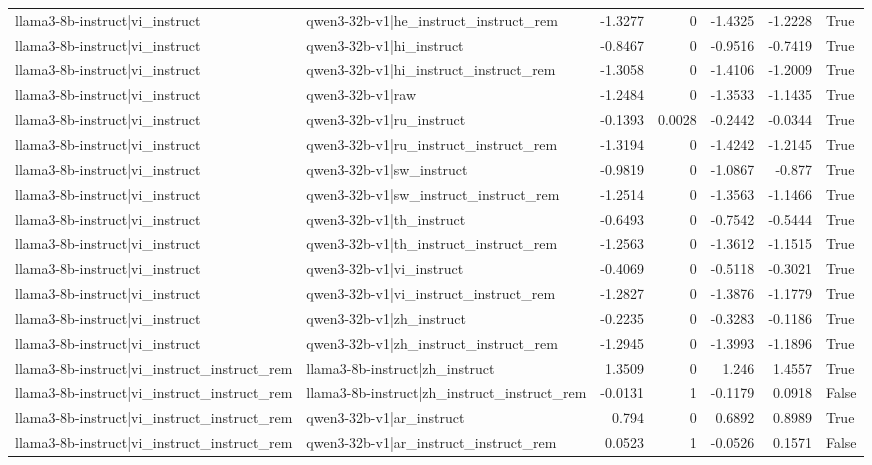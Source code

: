 \begin{table}
\begin{tabular}{l l r r r r l}
llama3-8b-instruct|vi_instruct & qwen3-32b-v1|he_instruct_instruct_rem & -1.3277 & 0 & -1.4325 & -1.2228 & True \\
llama3-8b-instruct|vi_instruct & qwen3-32b-v1|hi_instruct & -0.8467 & 0 & -0.9516 & -0.7419 & True \\
llama3-8b-instruct|vi_instruct & qwen3-32b-v1|hi_instruct_instruct_rem & -1.3058 & 0 & -1.4106 & -1.2009 & True \\
llama3-8b-instruct|vi_instruct & qwen3-32b-v1|raw & -1.2484 & 0 & -1.3533 & -1.1435 & True \\
llama3-8b-instruct|vi_instruct & qwen3-32b-v1|ru_instruct & -0.1393 & 0.0028 & -0.2442 & -0.0344 & True \\
llama3-8b-instruct|vi_instruct & qwen3-32b-v1|ru_instruct_instruct_rem & -1.3194 & 0 & -1.4242 & -1.2145 & True \\
llama3-8b-instruct|vi_instruct & qwen3-32b-v1|sw_instruct & -0.9819 & 0 & -1.0867 & -0.877 & True \\
llama3-8b-instruct|vi_instruct & qwen3-32b-v1|sw_instruct_instruct_rem & -1.2514 & 0 & -1.3563 & -1.1466 & True \\
llama3-8b-instruct|vi_instruct & qwen3-32b-v1|th_instruct & -0.6493 & 0 & -0.7542 & -0.5444 & True \\
llama3-8b-instruct|vi_instruct & qwen3-32b-v1|th_instruct_instruct_rem & -1.2563 & 0 & -1.3612 & -1.1515 & True \\
llama3-8b-instruct|vi_instruct & qwen3-32b-v1|vi_instruct & -0.4069 & 0 & -0.5118 & -0.3021 & True \\
llama3-8b-instruct|vi_instruct & qwen3-32b-v1|vi_instruct_instruct_rem & -1.2827 & 0 & -1.3876 & -1.1779 & True \\
llama3-8b-instruct|vi_instruct & qwen3-32b-v1|zh_instruct & -0.2235 & 0 & -0.3283 & -0.1186 & True \\
llama3-8b-instruct|vi_instruct & qwen3-32b-v1|zh_instruct_instruct_rem & -1.2945 & 0 & -1.3993 & -1.1896 & True \\
llama3-8b-instruct|vi_instruct_instruct_rem & llama3-8b-instruct|zh_instruct & 1.3509 & 0 & 1.246 & 1.4557 & True \\
llama3-8b-instruct|vi_instruct_instruct_rem & llama3-8b-instruct|zh_instruct_instruct_rem & -0.0131 & 1 & -0.1179 & 0.0918 & False \\
llama3-8b-instruct|vi_instruct_instruct_rem & qwen3-32b-v1|ar_instruct & 0.794 & 0 & 0.6892 & 0.8989 & True \\
llama3-8b-instruct|vi_instruct_instruct_rem & qwen3-32b-v1|ar_instruct_instruct_rem & 0.0523 & 1 & -0.0526 & 0.1571 & False \\

\end{tabular}
\end{table}
